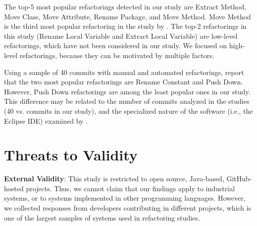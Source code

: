 The top-5 most popular refactorings detected in our study are 
{\textsc Extract Method}, {\textsc Move Class}, {\textsc Move Attribute}, {\textsc Rename Package}, and {\textsc Move Method}.
{\textsc Move Method} is the third most popular refactoring in the study by \cite{negara2013}.
The top-2 refactorings in this study ({\textsc Rename Local Variable} and {\textsc Extract Local Variable}) are low-level refactorings, which have not been considered in our study.
We focused on high-level refactorings, because they can be motivated by multiple factors.

Using a sample of 40 commits with manual and automated refactorings, \cite{MurphyHill2012} report that the two most popular refactorings are {\textsc Rename Constant} and {\textsc Push Down}. 
However, {\textsc Push Down} refactorings are among the least popular ones in our study. This difference 
may be related to the number of commits analyzed in the studies (40 vs. \commitsWithTruePositiveRefactoring commits in our study),
and the specialized nature of the software (i.e., the Eclipse IDE) examined by \cite{MurphyHill2012}.




\section{Threats to Validity}

\noindent \textbf{External Validity}: This study is restricted to open source, Java-based, GitHub-hosted projects. Thus, 
we cannot claim that our findings apply to industrial systems, or to systems implemented in other programming languages.
However, we collected responses from \studiedDevelopers developers contributing in \studiedProjects different projects, which is one of the largest samples
of systems used in refactoring studies.\margin

